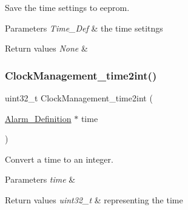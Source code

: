 Save the time settings to eeprom. 


\begin{DoxyParams}{Parameters}
{\em Time\+\_\+\+Def} & the time setitngs \\
\hline
\end{DoxyParams}

\begin{DoxyRetVals}{Return values}
{\em None} & \\
\hline
\end{DoxyRetVals}
\mbox{\label{group___clock___management_ga36a1b1fbb98de2b2b73ccb40e87e4518}} 
\subsubsection{\texorpdfstring{Clock\+Management\+\_\+time2int()}{ClockManagement\_time2int()}}
{\footnotesize\ttfamily uint32\+\_\+t Clock\+Management\+\_\+time2int (\begin{DoxyParamCaption}\item[{\hyperlink{struct_alarm___definition}{Alarm\+\_\+\+Definition} $\ast$}]{time }\end{DoxyParamCaption})}



Convert a time to an integer. 


\begin{DoxyParams}{Parameters}
{\em time} & \\
\hline
\end{DoxyParams}

\begin{DoxyRetVals}{Return values}
{\em uint32\+\_\+t} & representing the time \\
\hline
\end{DoxyRetVals}
